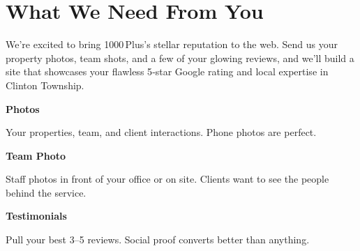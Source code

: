 \documentclass[11pt,letterpaper]{article}
\begin{document}
\vspace{0.2em}

\section*{What We Need From You}

We’re excited to bring 1000 Plus’s stellar reputation to the web. Send us your property photos, team shots, and a few of your glowing reviews, and we’ll build a site that showcases your flawless 5‑star Google rating and local expertise in Clinton Township.

\vspace{0.12em}

\noindent\begin{minipage}[t]{0.48\textwidth}
\begin{tcolorbox}[colframe=accent-teal, boxrule=1pt, left=0.7em, right=0.7em, top=0.5em, bottom=0.5em, arc=4pt, boxsep=0pt]
{\bfseries\small\color{accent-teal}Photos}

\vspace{0.15em}

{\small Your properties, team, and client interactions. Phone photos are perfect.}
\end{tcolorbox}

\vspace{0.1em}

\begin{tcolorbox}[colframe=accent-teal, boxrule=1pt, left=0.7em, right=0.7em, top=0.5em, bottom=0.5em, arc=4pt, boxsep=0pt]
{\bfseries\small\color{accent-teal}Team Photo}

\vspace{0.15em}

{\small Staff photos in front of your office or on site. Clients want to see the people behind the service.}
\end{tcolorbox}

\vspace{0.1em}

\begin{tcolorbox}[colframe=accent-teal, boxrule=1pt, left=0.7em, right=0.7em, top=0.5em, bottom=0.5em, arc=4pt, boxsep=0pt]
{\bfseries\small\color{accent-teal}Testimonials}

\vspace{0.15em}

{\small Pull your best 3–5 reviews. Social proof converts better than anything.}
\end{tcolorbox}
\end{minipage}
\end{document}
